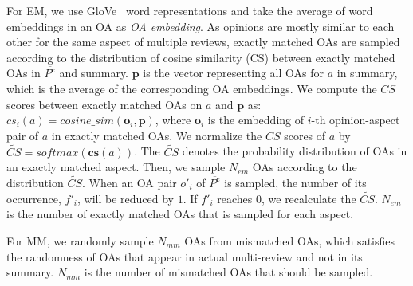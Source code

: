 {For EM, we use GloVe~\cite{glove} word representations 
and take the average of word embeddings in an OA
as {\em OA embedding}.
As opinions are mostly similar to each other for the same aspect of multiple reviews,
exactly matched OAs are sampled according to
the distribution of cosine similarity (CS) 
between exactly matched OAs in $\overline{P^e}$ and summary.
$\boldsymbol{p}$ is the vector representing all OAs for $a$ in summary, 
which is the average of the corresponding OA embeddings. %
We compute the $CS$ scores between exactly matched OAs on $a$ and $\boldsymbol{p}$ as: $cs_i(a)=cosine\_sim(\boldsymbol{o}_{i}, \boldsymbol{p})$,
where $\boldsymbol{o}_{i}$ is the embedding of $i$-th opinion-aspect pair of $a$ in exactly matched OAs.
We normalize the $CS$ scores of $a$
by $\widetilde{CS}=softmax(\mathbf{cs}(a))$. 
The $\widetilde{CS}$ denotes the probability distribution 
of OAs in an exactly matched aspect.
Then, we sample $N_{em}$ OAs
according to the distribution $\widetilde{CS}$. 
When an OA pair $o'_i$ of $\overline{P^e}$ is sampled, the number of its occurrence, $f'_i$, will be 
reduced by $1$.
If $f'_i$ reaches $0$, we recalculate the $\widetilde{CS}$.
$N_{em}$ is the number of exactly matched OAs that is sampled for each aspect.%

For MM,
we randomly sample $N_{mm}$ OAs from mismatched OAs,
which satisfies the randomness
of OAs that appear in actual multi-review 
and not in its summary.
$N_{mm}$ is the number of mismatched OAs that should be sampled.

}
